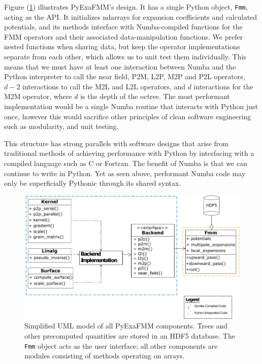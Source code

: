 \documentclass{IEEEcsmag}
\begin{document}
Figure (\ref{fig:design}) illustrates PyExaFMM's design. It has a single Python object, \texttt{Fmm}, acting as the API. It initializes ndarrays for expansion coefficients and calculated potentials, and its methods interface with Numba-compiled functions for the FMM operators and their associated data-manipulation functions. We prefer nested functions when sharing data, but keep the operator implementations separate from each other, which allows us to unit test them individually. This means that we must have at least one interaction between Numba and the Python interpreter to call the near field, P2M, L2P, M2P and P2L operators, $d-2$ interactions to call the  M2L and L2L operators, and $d$ interactions for the M2M operator, where $d$ is the depth of the octree. The most performant implementation would be a single Numba routine that interacts with Python just once, however this would sacrifice other principles of clean software engineering such as modularity, and unit testing.

This structure has strong parallels with software designs that arise from traditional methods of achieving performance with Python by interfacing with a compiled language such as C or Fortran. The benefit of Numba is that we can continue to write in Python. Yet as seen above, performant Numba code may only be superficially Pythonic through its shared syntax.

\begin{figure}
    \centerline{\includegraphics {figures/software.pdf}}
    \caption{Simplified UML model of all PyExaFMM components. Trees and other precomputed quantities are stored in an HDF5 database. The \texttt{Fmm} object acts as the user interface; all other components are modules consisting of methods operating on arrays.}
    \label{fig:design}
\end{figure}
\end{document}
